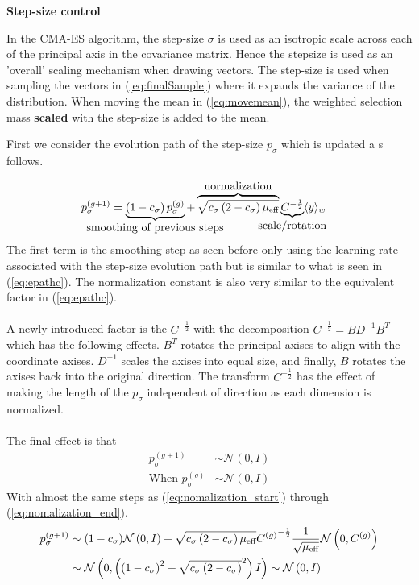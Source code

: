 \textbf{Step-size control}

In the CMA-ES algorithm, the step-size $\sigma$ is used as an isotropic scale across
each of the principal axis in the covariance matrix. Hence the stepsize is used as 
an 'overall' scaling mechanism when drawing vectors. The step-size is used when 
sampling the vectors in (\ref{eq:finalSample}) where it expands the variance 
of the distribution. When moving the mean in (\ref{eq:movemean}), the weighted 
selection mass \textbf{scaled} with the step-size is added to the mean.


First we consider the evolution path of the step-size $p_\sigma$ which is
updated a s follows.

\begin{align}
p_{\sigma}^{(g+1)} &= 
\underbrace{\left( 1 - c_{\sigma} \right) p_{\sigma}^{(g)}}_{
\makebox[0pt]{\text{{smoothing of previous steps}}}
}
+ 
\overbrace{\sqrt{c_{\sigma} \left( 2 - c_{\sigma} \right) \meff}}
^{
\makebox[0pt]{\text{{normalization}}}
} 
\underbrace{C^{- \frac{1}{2}}}_{
\makebox[0pt]{\text{{scale/rotation}}}
}
\langle y \rangle_{w}
\end{align}
The first term is the smoothing step as seen before only using the learning rate 
associated with the step-size evolution path but is similar to what is seen in
(\ref{eq:epathc}). The normalization constant is also very similar to the
equivalent factor in (\ref{eq:epathc}).\\
\\
A newly introduced factor is the $C^{-\frac{1}{2}}$ with the decomposition
$C^{-\frac{1}{2}} = B D^{-1} B^{T}$ which has the following effects. $B^{T}$
rotates the principal axises to align with the coordinate axises. 
$D^{-1}$ scales the axises into equal size, and finally, $B$ rotates the 
axises back into the original direction. The transform $C^{-\frac{1}{2}}$
has the effect of making the length of the $p_\sigma$ independent of 
direction as each dimension is normalized.\\
\\
The final effect is that
\begin{align}
p_\sigma^{(g+1)} &\sim \mathcal{N}\left(0, I \right)\\
\text{When }
p_\sigma^{(g)} &\sim \mathcal{N} \left(0, I \right)
\end{align}
With almost the same steps as (\ref{eq:nomalization_start}) through 
(\ref{eq:nomalization_end}).
\begin{align}
p_\sigma^{(g+1)} &\sim (1 - c_\sigma) \mathcal{N}\left( 0, I \right) + \sqrt{c_\sigma 
\left( 2-c_\sigma \right)\mu_{\text{eff}} } {C^{(g)}}^{-\frac{1}{2}} \frac{1}{\sqrt{\mu_{\text{eff}}}}
\mathcal{N} \left( 0, C^{(g)} \right)\\
&\sim \mathcal{N} 
\left( 
  0, 
  \left(  
    \left( 
      1-c_\sigma 
    \right)^2 + \sqrt{c_\sigma 
    \left(  
      2 - c_\sigma
    \right)}^2
  \right) I
\right) \sim \mathcal{N} \left( 0, I \right)
\end{align}

